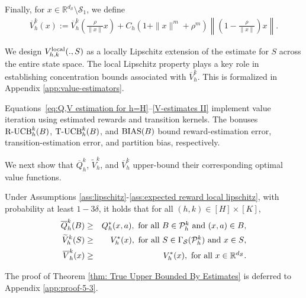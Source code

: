 \documentclass[final,supplement]{siamart251216}
\begin{document}
Finally, for $x \in \mathbb{R}^{d_{\mathcal{S}}}\setminus\mathcal{S}_{1}$, we define 
\begin{eqnarray}\label{V-estimates II}
    \overline{V}_{h}^{k}(x):=\overline{V}_{h}^{k}\left(\frac{\rho}{\|x\|}x\right)+C_{h}(1+\|x\|^{m}+\rho^{m})\left\|\left(1-\frac{\rho}{\|x\|}\right)x\right\|.
\end{eqnarray}

\begin{remark}
   We design 
$V^{\rm local}_{h,k}(.,S)$ as a locally Lipschitz extension of the estimate for $S$ across the entire state space. The local Lipschitz property plays a key role in establishing concentration bounds associated with $\overline{V}_{h}^{k}$. This is formalized in Appendix \ref{app:value-estimators}.
\end{remark}



Equations~\eqref{eq:Q,V estimation for h=H}--\eqref{V-estimates II}
implement value iteration using estimated rewards and transition kernels.
The bonuses $\mbox{\rm R-UCB}_h^k(B)$, $\mbox{\rm T-UCB}_h^k(B)$, and
${\rm BIAS}(B)$ bound reward-estimation error, transition-estimation error,
and partition bias, respectively.




We next show that $\overline Q_h^k$, $\widetilde V_h^k$, and
$\overline V_h^k$ upper-bound their corresponding optimal value functions.



\begin{theorem} \label{thm: True Upper Bounded By Estimates}
Under Assumptions \ref{ass:lipschitz}-\ref{ass:expected reward local lipschitz}, with probability at least $1-3\delta$, it holds that for all $(h,k) \in [H]\times[K]$, 
\begin{eqnarray}\label{eq:upperbound}
     \overline{Q}_{h}^{k}(B)&\geq& Q_{h}^{*}(x,a),\,\, \mbox{for all $B \in \mathcal{P}_h^k $ and  $ (x,a) \in B$}, \nonumber\\
     \widetilde{V}_{h}^{k}(S)&\geq& V_{h}^{*}(x), \,\,\mbox{for all $S \in \Gamma_{\mathcal{S}}(\mathcal{P}_h^k)$ and $x \in S$}, \nonumber\\
     \overline{V}_{h}^{k}(x)&\geq& V_{h}^{*}(x), \,\,\mbox{for all $x \in \mathbb{R}^{d_{\mathcal{S}}}$}.    
\end{eqnarray} 
\end{theorem}
The proof of Theorem \ref{thm: True Upper Bounded By Estimates} is deferred to Appendix \ref{app:proof-5-3}. \\
\end{document}
